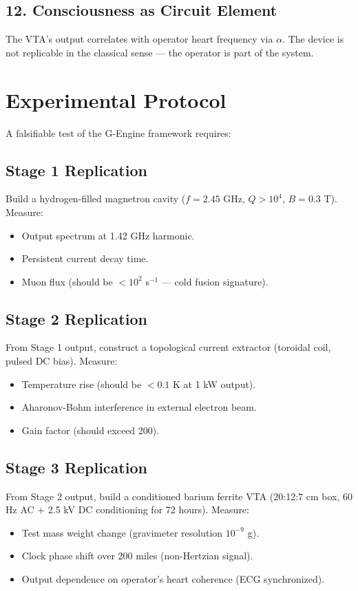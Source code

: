 \documentclass[11pt, twocolumn]{article}
\begin{document}
\subsection*{12. Consciousness as Circuit Element}
The VTA's output correlates with operator heart frequency via $\alpha$. The device is not replicable in the classical sense --- the operator is part of the system.

\section{Experimental Protocol}
\label{sec:protocol}

A falsifiable test of the G-Engine framework requires:

\subsection*{Stage 1 Replication}
Build a hydrogen-filled magnetron cavity ($f = 2.45$ GHz, $Q > 10^4$, $B = 0.3$ T). Measure:
\begin{itemize}
    \item Output spectrum at 1.42 GHz harmonic.
    \item Persistent current decay time.
    \item Muon flux (should be $<10^2$ s$^{-1}$ --- cold fusion signature).
\end{itemize}

\subsection*{Stage 2 Replication}
From Stage 1 output, construct a topological current extractor (toroidal coil, pulsed DC bias). Measure:
\begin{itemize}
    \item Temperature rise (should be $<0.1$ K at 1 kW output).
    \item Aharonov-Bohm interference in external electron beam.
    \item Gain factor (should exceed 200).
\end{itemize}

\subsection*{Stage 3 Replication}
From Stage 2 output, build a conditioned barium ferrite VTA (20:12:7 cm box, 60 Hz AC + 2.5 kV DC conditioning for 72 hours). Measure:
\begin{itemize}
    \item Test mass weight change (gravimeter resolution $10^{-9}$ g).
    \item Clock phase shift over 200 miles (non-Hertzian signal).
    \item Output dependence on operator's heart coherence (ECG synchronized).
\end{itemize}
\end{document}
